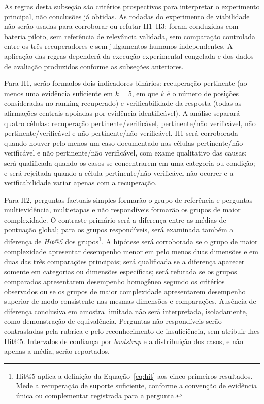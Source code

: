 As regras desta subseção são critérios prospectivos para interpretar o experimento principal, não conclusões já obtidas. As rodadas do experimento de viabilidade não serão usadas para corroborar ou refutar H1--H3: foram conduzidas com bateria piloto, sem referência de relevância validada, sem comparação controlada entre os três recuperadores e sem julgamentos humanos independentes. A aplicação das regras dependerá da execução experimental congelada e dos dados de avaliação produzidos conforme as subseções anteriores.

Para H1, serão formados dois indicadores binários: recuperação pertinente (ao menos uma evidência suficiente em $k=5$, em que $k$ é o número de posições consideradas no ranking recuperado) e verificabilidade da resposta (todas as afirmações centrais apoiadas por evidência identificável). A análise separará quatro células: recuperação pertinente/verificável, pertinente/não verificável, não pertinente/verificável e não pertinente/não verificável. H1 será corroborada quando houver pelo menos um caso documentado nas células pertinente/não verificável e não pertinente/não verificável, com exame qualitativo das causas; será qualificada quando os casos se concentrarem em uma categoria ou condição; e será rejeitada quando a célula pertinente/não verificável não ocorrer e a verificabilidade variar apenas com a recuperação.

Para H2, perguntas factuais simples formarão o grupo de referência e perguntas multievidência, multietapas e não respondíveis formarão os grupos de maior complexidade. O contraste primário será a diferença entre as médias de pontuação global; para os grupos respondíveis, será examinada também a diferença de \textit{Hit@5} dos grupos\footnote{Hit@5 aplica a definição da Equação~\ref{eq:hit} aos cinco primeiros resultados. Mede a recuperação de suporte suficiente, conforme a convenção de evidência única ou complementar registrada para a pergunta.}. A hipótese será corroborada se o grupo de maior complexidade apresentar desempenho menor em pelo menos duas dimensões e em duas das três comparações principais; será qualificada se a diferença aparecer somente em categorias ou dimensões específicas; será refutada se os grupos comparados apresentarem desempenho homogêneo segundo os critérios observados ou se os grupos de maior complexidade apresentarem desempenho superior de modo consistente nas mesmas dimensões e comparações. Ausência de diferença conclusiva em amostra limitada não será interpretada, isoladamente, como demonstração de equivalência. Perguntas não respondíveis serão contrastadas pela rubrica e pelo reconhecimento de insuficiência, sem atribuir-lhes Hit@5. Intervalos de confiança por \textit{bootstrap} e a distribuição dos casos, e não apenas a média, serão reportados.

